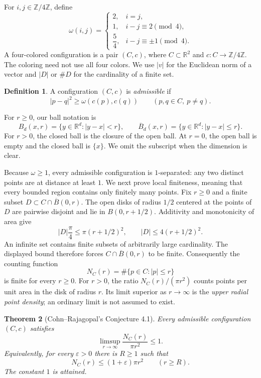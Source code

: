 \documentclass[11pt,a4paper]{article}
\newtheorem{theorem}{Theorem}[section]
\theoremstyle{definition}
\newtheorem{definition}[theorem]{Definition}
\theoremstyle{remark}
\newcommand{\R}{\mathbb{R}}
\newcommand{\Z}{\mathbb{Z}}
\begin{document}
For $i,j\in\Z/4\Z$, define
\begin{equation}
\label{eq:weights}
\omega(i,j)=
\begin{cases}
2,&i=j,\\
1,&i-j\equiv2\pmod4,\\
\dfrac54,&i-j\equiv\pm1\pmod4.
\end{cases}
\end{equation}
A four-colored configuration is a pair $(C,c)$, where
$C\subset\R^2$ and $c:C\to\Z/4\Z$. The coloring need not use all four
colors. We use $|v|$ for the Euclidean norm of a vector and $|D|$ or
$\#D$ for the cardinality of a finite set.

\begin{definition}
\label{def:admissible}
A configuration $(C,c)$ is \emph{admissible} if
\begin{equation}
\label{eq:admissible}
|p-q|^2\geq\omega(c(p),c(q))
\qquad(p,q\in C,\ p\ne q).
\end{equation}
\end{definition}

For $r\geq0$, our ball notation is
\[
B_d(x,r)=\{y\in\R^d:|y-x|<r\},\qquad
\overline B_d(x,r)=\{y\in\R^d:|y-x|\leq r\}.
\]
For $r>0$, the closed ball is the closure of the open ball. At $r=0$,
the open ball is empty and the closed ball is $\{x\}$.
We omit the subscript when the dimension is clear.

Because $\omega\geq1$, every admissible configuration is $1$-separated:
any two distinct points are at distance at least $1$. We next prove local
finiteness, meaning that every bounded region contains only finitely many
points. Fix $r\geq0$ and a finite
subset $D\subset C\cap\overline B(0,r)$. The open disks of radius $1/2$
centered at the points of $D$ are pairwise disjoint and lie in
$B(0,r+1/2)$. Additivity and monotonicity of area give
\[
|D|\frac{\pi}{4}\leq\pi(r+1/2)^2,
\qquad |D|\leq4(r+1/2)^2.
\]
An infinite set contains finite subsets of arbitrarily large cardinality.
The displayed bound therefore forces $C\cap\overline B(0,r)$ to be finite.
Consequently the counting function
\[
N_C(r)=\#\{p\in C:|p|\leq r\}
\]
is finite for every $r\geq0$. For $r>0$, the ratio $N_C(r)/(\pi r^2)$ counts
points per unit area in the disk of radius $r$. Its limit superior as
$r\to\infty$ is the \emph{upper radial point density}; an ordinary limit
is not assumed to exist.
\begin{theorem}[Cohn--Rajagopal's Conjecture 4.1]
\label{thm:main}
Every admissible configuration $(C,c)$ satisfies
\begin{equation}
\label{eq:main-limsup}
\limsup_{r\to\infty}\frac{N_C(r)}{\pi r^2}\leq1.
\end{equation}
Equivalently, for every $\varepsilon>0$ there is $R\geq1$ such that
\begin{equation}
\label{eq:main-eventual}
N_C(r)\leq(1+\varepsilon)\pi r^2\qquad(r\geq R).
\end{equation}
The constant $1$ is attained.
\end{theorem}
\end{document}
